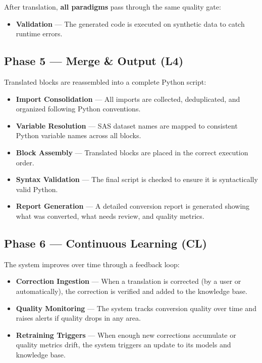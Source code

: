 \documentclass[11pt,a4paper]{article}
\begin{document}
After translation, \textbf{all paradigms} pass through the same quality gate:
\begin{itemize}[leftmargin=1.5em]
    \item \textbf{Validation} — The generated code is executed on synthetic data to catch runtime errors.
\end{itemize}

\subsection{Phase 5 — Merge \& Output (L4)}

Translated blocks are reassembled into a complete Python script:

\begin{itemize}[leftmargin=1.5em]
    \item \textbf{Import Consolidation} — All imports are collected, deduplicated, and organized following Python conventions.
    \item \textbf{Variable Resolution} — SAS dataset names are mapped to consistent Python variable names across all blocks.
    \item \textbf{Block Assembly} — Translated blocks are placed in the correct execution order.
    \item \textbf{Syntax Validation} — The final script is checked to ensure it is syntactically valid Python.
    \item \textbf{Report Generation} — A detailed conversion report is generated showing what was converted, what needs review, and quality metrics.
\end{itemize}

\subsection{Phase 6 — Continuous Learning (CL)}

The system improves over time through a feedback loop:

\begin{itemize}[leftmargin=1.5em]
    \item \textbf{Correction Ingestion} — When a translation is corrected (by a user or automatically), the correction is verified and added to the knowledge base.
    \item \textbf{Quality Monitoring} — The system tracks conversion quality over time and raises alerts if quality drops in any area.
    \item \textbf{Retraining Triggers} — When enough new corrections accumulate or quality metrics drift, the system triggers an update to its models and knowledge base.
\end{itemize}
\end{document}
